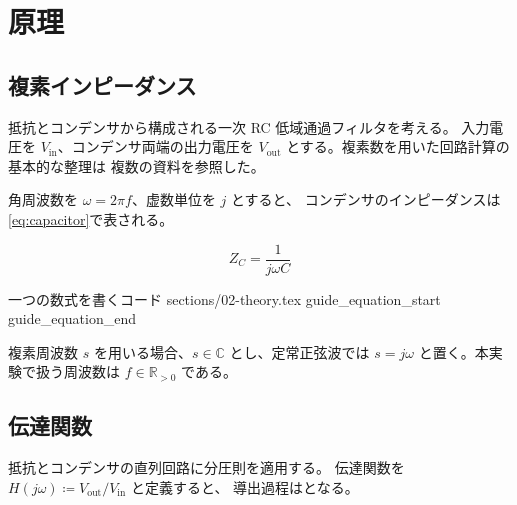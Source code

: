 \section{原理}
\label{sec:theory}

\subsection{複素インピーダンス}
\label{subsec:impedance}

抵抗とコンデンサから構成される一次 RC 低域通過フィルタを考える。
入力電圧を $V_{\mathrm{in}}$、コンデンサ両端の出力電圧を
$V_{\mathrm{out}}$ とする。複素数を用いた回路計算の基本的な整理は
複数の資料を参照した\cite{jp-book,jp-article,jp-inbook}。

角周波数を $\omega=2\pi f$、虚数単位を $j$ とすると、
コンデンサのインピーダンスは\cref{eq:capacitor}で表される。

\begin{equation}
  Z_C=\frac{1}{j\omega C}
  \label{eq:capacitor}
\end{equation}

\SampleGuideSource
  {一つの数式を書くコード}
  {sections/02-theory.tex}
  {guide_equation_start}
  {guide_equation_end}


複素周波数 $s$ を用いる場合、$s\in\mathbb{C}$ とし、定常正弦波では
$s=j\omega$ と置く。本実験で扱う周波数は $f\in\mathbb{R}_{>0}$ である。


\subsection{伝達関数}
\label{subsec:transfer}

抵抗とコンデンサの直列回路に分圧則を適用する。
伝達関数を $H(j\omega)\coloneqq V_{\mathrm{out}}/V_{\mathrm{in}}$ と定義すると、
導出過程はとなる。

